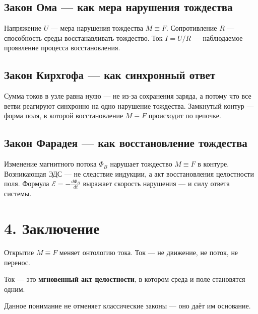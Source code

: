 \documentclass[12pt]{article}
\begin{document}
\subsection*{Закон Ома — как мера нарушения тождества}
Напряжение $ U $ — мера нарушения тождества $ M \equiv F $.  
Сопротивление $ R $ — способность среды восстанавливать тождество.  
Ток $ I = U/R $ — наблюдаемое проявление процесса восстановления.

\subsection*{Закон Кирхгофа — как синхронный ответ}
Сумма токов в узле равна нулю — не из-за сохранения заряда,  
а потому что все ветви реагируют синхронно на одно нарушение тождества.  
Замкнутый контур — форма поля, в которой восстановление $ M \equiv F $ происходит по цепочке.

\subsection*{Закон Фарадея — как восстановление тождества}
Изменение магнитного потока $\Phi_B$ нарушает тождество $ M \equiv F $ в контуре. 
Возникающая ЭДС — не следствие индукции, а акт восстановления целостности поля. 
Формула $\mathcal{E} = -\frac{d\Phi_B}{dt}$ выражает скорость нарушения — и силу ответа системы.

\section*{4. Заключение}
Открытие $ M \equiv F $ меняет онтологию тока.  
Ток — не движение,  
не поток,  
не перенос.

Ток — это \textbf{мгновенный акт целостности},  
в котором среда и поле становятся одним.

Данное понимание не отменяет классические законы —  
оно даёт им основание.
\end{document}

